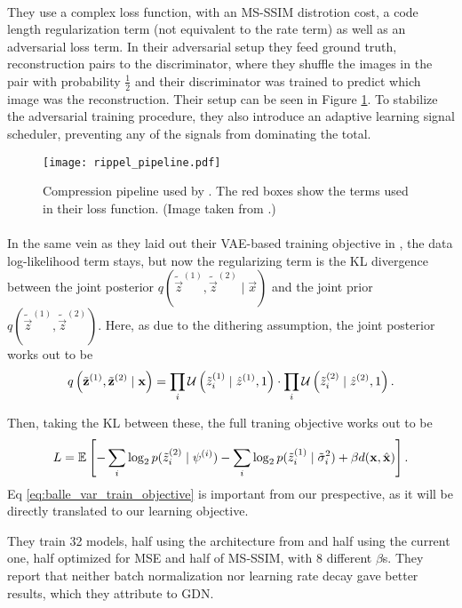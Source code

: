 \paragraph{\cite{rippel2017real}} They use a complex loss function, with an MS-SSIM
distrotion cost, a code length regularization term (not equivalent to the rate
term) as well as an adversarial loss term. In their adversarial setup they feed
ground truth, reconstruction pairs to the discriminator, where they shuffle the
images in the pair with probability $\frac12$ and their discriminator was
trained to predict which image was the reconstruction. Their setup can be seen
in Figure \ref{fig:rippel_pipeline}. To stabilize the
adversarial training procedure, they also introduce an adaptive learning signal
scheduler, preventing any of the signals from dominating the total.
\begin{figure}
  \centering 
  \texttt{[image: rippel\_pipeline.pdf]}
  \caption[Compression pipeline used by \cite{rippel2017real}.]
  {Compression pipeline used by \cite{rippel2017real}. The red boxes
    show the terms used in their loss function. (Image taken from \cite{rippel2017real}.)}
  \label{fig:rippel_pipeline}
\end{figure}

\paragraph{\cite{balle2018variational}} In the same vein as they laid out their
  VAE-based training objective in \cite{balle2016end}, the data log-likelihood
  term stays, but now the regularizing term is the KL divergence between the
  joint posterior $q(\tilde{\vec{z}}^{(1)}, \tilde{\vec{z}}^{(2)} \mid \vec{x})$
  and the joint prior 
  $q(\tilde{\vec{z}}^{(1)}, \tilde{\vec{z}}^{(2)})$. Here, as due to the
  dithering assumption, the joint posterior works out to be
  \[
    q\left(\tilde{\mathbf{z}}^{(1)}, \tilde{\mathbf{z}}^{(2)} \mid \mathbf{x}\right) =
    \prod_i \mathcal{U}\left( \tilde{z}^{(1)}_i \mid \hat{z}^{(1)}, 1 \right) \cdot
    \prod_i \mathcal{U}\left( \tilde{z}^{(2)}_i \mid \hat{z}^{(2)}, 1 \right).
  \]
  \par
  Then, taking the KL between these, the full traning objective works out to be
  \begin{equation}
    \label{eq:balle_var_train_objective}
    L = \mathbb{E}_{}\left[  -\sum_i \log_2 p(\tilde{z}^{(2)}_i \mid \psi^{(i)}) 
      -\sum_i \log_2 p(\tilde{z}^{(1)}_i \mid \tilde{\sigma}^2_i) +
      \beta d(\mathbf{x}, \hat{\mathbf{x}}) \right].
  \end{equation}
  Eq \ref{eq:balle_var_train_objective} is important from our prespective, as
  it will be
  directly translated to our learning objective.
  \par
  They train 32 models, half using the architecture from \cite{balle2016end} and
  half using the current one, half optimized for MSE and half of MS-SSIM, with 8
  different $\beta$s. They report that neither batch normalization nor learning
  rate decay gave better results, which they attribute to GDN.


